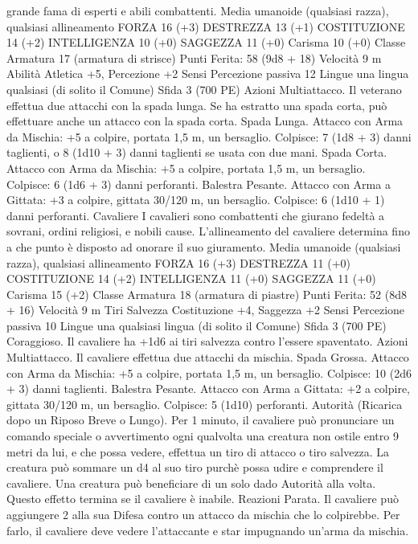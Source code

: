 \begin{multicols}{2}
grande fama di esperti e abili combattenti.
Media umanoide (qualsiasi razza), qualsiasi allineamento
FORZA 16 (+3)
DESTREZZA 13 (+1)
COSTITUZIONE 14 (+2)
INTELLIGENZA 10 (+0)
SAGGEZZA 11 (+0)
Carisma 10 (+0)
Classe Armatura 17 (armatura di strisce)
\hspace*{0pt}\hfill{Punti Ferita}: 58 (9d8 + 18)
Velocità 9 m
Abilità Atletica +5, Percezione +2
Sensi Percezione passiva 12
Lingue una lingua qualsiasi (di solito il Comune)
Sfida 3 (700 PE)
Azioni
Multiattacco. Il veterano effettua due attacchi con la spada
lunga. Se ha estratto una spada corta, può effettuare anche un
attacco con la spada corta.
Spada Lunga. Attacco con Arma da Mischia: +5 a colpire,
portata 1,5 m, un bersaglio.
Colpisce: 7 (1d8 + 3) danni taglienti, o 8 (1d10 + 3) danni
taglienti se usata con due mani.
Spada Corta. Attacco con Arma da Mischia: +5 a colpire, portata
1,5 m, un bersaglio.
Colpisce: 6 (1d6 + 3) danni perforanti.
Balestra Pesante. Attacco con Arma a Gittata: +3 a colpire,
gittata 30/120 m, un bersaglio.
Colpisce: 6 (1d10 + 1) danni perforanti.
Cavaliere
I cavalieri sono combattenti che giurano fedeltà a
sovrani, ordini religiosi, e nobili cause. L’allineamento
del cavaliere determina fino a che punto è disposto ad
onorare il suo giuramento.
Media umanoide (qualsiasi razza), qualsiasi allineamento
FORZA 16 (+3)
DESTREZZA 11 (+0)
COSTITUZIONE 14 (+2)
INTELLIGENZA 11 (+0)
SAGGEZZA 11 (+0)
Carisma 15 (+2)
Classe Armatura 18 (armatura di piastre)
\hspace*{0pt}\hfill{Punti Ferita}: 52 (8d8 + 16)
Velocità 9 m
Tiri Salvezza Costituzione +4, Saggezza +2
Sensi Percezione passiva 10
Lingue una qualsiasi lingua (di solito il Comune)
Sfida 3 (700 PE)
Coraggioso. Il cavaliere ha +1d6 ai tiri salvezza contro
l’essere spaventato.
Azioni
Multiattacco. Il cavaliere effettua due attacchi da mischia.
Spada Grossa. Attacco con Arma da Mischia: +5 a colpire,
portata 1,5 m, un bersaglio.
Colpisce: 10 (2d6 + 3) danni taglienti.
Balestra Pesante. Attacco con Arma a Gittata: +2 a colpire,
gittata 30/120 m, un bersaglio.
Colpisce: 5 (1d10) perforanti.
Autorità (Ricarica dopo un Riposo Breve o Lungo). Per 1
minuto, il cavaliere può pronunciare un comando speciale o
avvertimento ogni qualvolta una creatura non ostile entro 9 metri
da lui, e che possa vedere, effettua un tiro di attacco o tiro
salvezza. La creatura può sommare un d4 al suo tiro purchè
possa udire e comprendere il cavaliere. Una creatura può
beneficiare di un solo dado Autorità alla volta. Questo effetto
termina se il cavaliere è inabile.
Reazioni
Parata. Il cavaliere può aggiungere 2 alla sua Difesa contro un
attacco da mischia che lo colpirebbe. Per farlo, il cavaliere deve
vedere l’attaccante e star impugnando un’arma da mischia.
 

\end{multicols}
